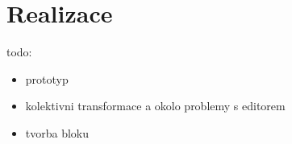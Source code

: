 \chapter{Realizace}

todo:

\begin{itemize}
    \item prototyp
    \item kolektivni transformace a okolo problemy s editorem
    \item tvorba bloku
\end{itemize}